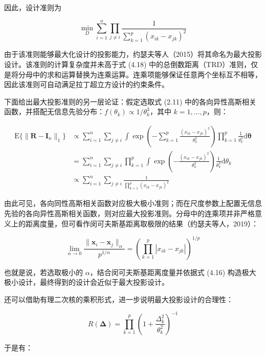 \documentclass{ctexart}
\begin{document}
因此，设计准则为

\begin{equation*}
\min_D\sum_{i=1}^n\prod_{j\neq i}\frac{1}{\sum_{k=1}^p(x_{ik}-x_{jk})^2}
\tag{4.23}
\end{equation*}

由于该准则能够最大化设计的投影能力，约瑟夫等人（2015）将其命名为最大投影设计。该准则的计算复杂度并未高于式 (4.18) 中的总倒数距离（TRD）准则，仅是将分母中的求和运算替换为连乘运算。连乘项能够保证任意两个坐标互不相等，因此该准则可自动满足拉丁超立方设计的约束条件。

下面给出最大投影准则的另一层论证：假定选取式 (2.11) 中的各向异性高斯相关函数，并搭配无信息先验分布：$f(\theta_k)\propto 1/\theta_k^3$，其中 $k=1,\dots,p$，则：

\begin{align*}
\mathrm{E}\{\|\boldsymbol{R} -\boldsymbol{I}_n\|_1\}&\propto\sum_{i=1}^{n}\sum_{j\neq i}\int\exp\left(-\sum_{k=1}^{p}\frac{(x_{ik}-x_{jk})^2}{\theta_k^2}\right)\prod_{k=1}^{p}\frac{1}{\theta_k^3}\mathrm{d}\boldsymbol{\theta}
\tag{4.24}\\
&=\sum_{i=1}^{n}\sum_{j\neq i}\prod_{k=1}^{p}\int\exp\left(-\frac{(x_{ik}-x_{jk})^2}{\theta_k^2}\right)\frac{1}{\theta_k^3}\mathrm{d}\theta_k\\
&\propto\sum_{i=1}^{n}\sum_{j\neq i}\frac{1}{\prod_{k=1}^{p}(x_{ik}-x_{jk})^2}
\end{align*}

由此可见，各向同性高斯相关函数对应极大极小准则；而在尺度参数上配置无信息先验的各向异性高斯相关函数，则对应最大投影准则。分母中的连乘项并非严格意义上的距离度量，但可看作闵可夫斯基距离取极限的结果（约瑟夫等人，2019）：

\begin{equation*}
\lim_{\alpha\to0}\frac{\|\boldsymbol{x}_i-\boldsymbol{x}_j\|_\alpha}{p^{1/\alpha}}=\left(\prod_{k=1}^{p}|x_{ik}-x_{jk}|\right)^{1/p}
\tag{4.25}
\end{equation*}

也就是说，若选取极小的 $\alpha$，结合闵可夫斯基距离度量并依据式 (4.16) 构造极大极小设计，最终得到的设计会近似于最大投影设计。

还可以借助有理二次核的乘积形式，进一步说明最大投影设计的合理性：

\begin{equation*}
R(\boldsymbol{\Delta})=\prod_{k=1}^{p}\left(1+\frac{\Delta_k^2}{\theta_k^2}\right)^{-1}
\tag{4.26}
\end{equation*}

于是有：
\end{document}
